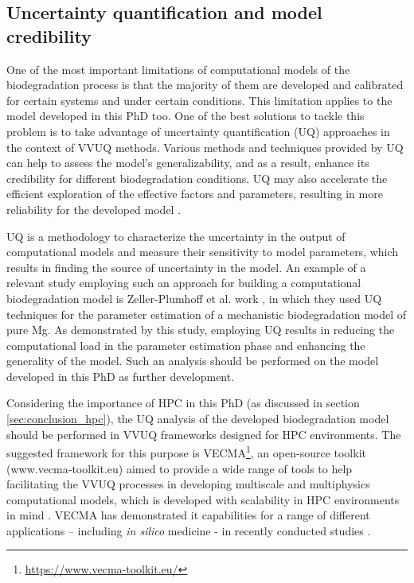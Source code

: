 \subsection{Uncertainty quantification and model credibility } \label{sec:conclusion_vvuq}


One of the most important limitations of computational models of the biodegradation process is that the majority of them are developed and calibrated for certain systems and under certain conditions. This limitation applies to the model developed in this PhD too. One of the best solutions to tackle this problem is to take advantage of uncertainty quantification (\gls{UQ}) approaches in the context of VVUQ methods. Various methods and techniques provided by UQ can help to assess the model's generalizability, and as a result, enhance its credibility for different biodegradation conditions. UQ may also accelerate the efficient exploration of the effective factors and parameters, resulting in more reliability for the developed model \cite{Albaraghtheh2022}.

UQ is a methodology to characterize the uncertainty in the output of computational models and measure their sensitivity to model parameters, which results in finding the source of uncertainty in the model. An example of a relevant study employing such an approach for building a computational biodegradation model is Zeller-Plumhoff et al. work \cite{Zeller-Plumhoff2022}, in which they used UQ techniques for the parameter estimation of a mechanistic biodegradation model of pure Mg. As demonstrated by this study, employing UQ results in reducing the computational load in the parameter estimation phase and enhancing the generality of the model. Such an analysis should be performed on the model developed in this PhD as further development. 

Considering the importance of HPC in this PhD (as discussed in section \ref{sec:conclusion_hpc}), the UQ analysis of the developed biodegradation model should be performed in VVUQ frameworks designed for HPC environments. The suggested framework for this purpose is VECMA\footnote{\url{https://www.vecma-toolkit.eu/}}, an open-source toolkit (www.vecma-toolkit.eu) aimed to provide a wide range of tools to help facilitating the VVUQ processes in developing multiscale and multiphysics computational models, which is developed with scalability in HPC environments in mind \cite{Groen2021}. VECMA has demonstrated it capabilities for a range of different applications – including \textit{in silico} medicine - in recently conducted studies \cite{Suleimenova2021,Suter2021,Vassaux2021,Coveney2021}.


